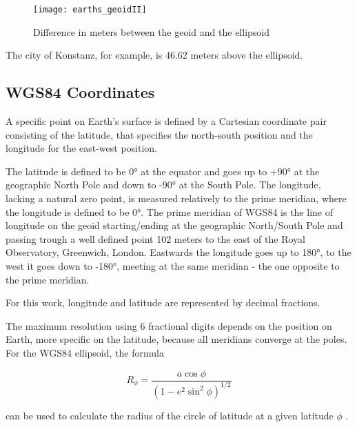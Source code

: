 \begin{figure}[H]
\centering
\texttt{[image: earths\_geoidII]}
\caption{Difference in meters between the geoid and the ellipsoid \cite{nasageoid}}
\end{figure}

The city of Konstanz, for example, is 46.62 meters above the ellipsoid.

\subsection{WGS84 Coordinates}

A specific point on Earth's surface is defined by a Cartesian coordinate pair consisting of the latitude, that specifies the north-south position and the longitude for the east-west position. 

The latitude is defined to be 0° at the equator and goes up to +90° at the geographic North Pole and down to -90° at the South Pole. The longitude, lacking a natural zero point, is measured relatively to the prime meridian, where the longitude is defined to be 0°. The prime meridian of WGS84 is the line of longitude on the geoid starting/ending at the geographic North/South Pole and passing trough a well defined point 102 meters to the east of the Royal Observatory, Greenwich, London. Eastwards the longitude goes up to 180°, to the west it goes down to -180°, meeting at the same meridian - the one opposite to the prime meridian. 


For this work, longitude and latitude are represented by decimal fractions.

The maximum resolution using 6 fractional digits depends on the position on Earth, more specific on the latitude, because all meridians converge at the poles. For the WGS84 ellipsoid, the formula 

\[R_{\phi} = \frac{a \cos\phi}{(1-e^{2}\sin^{2}\phi )^{1/2}}\]

can be used to calculate the radius of the circle of latitude at a given latitude \(\phi\) \cite[cf.][Ch. 2.4]{ellipsoid}. 


